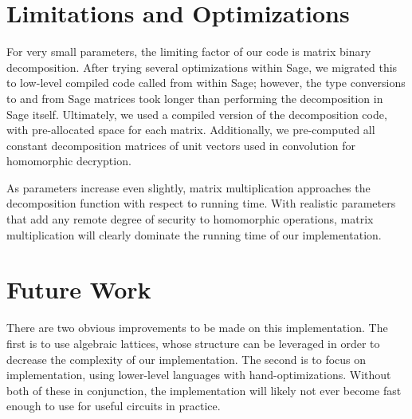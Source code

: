 \documentclass{article}
\begin{document}
\section{Limitations and Optimizations}

For very small parameters, the limiting factor of our code is matrix binary
decomposition. After trying several optimizations within Sage, we migrated
this to low-level compiled code called from within Sage; however, the type 
conversions to and from Sage matrices took longer than performing the 
decomposition in Sage itself. Ultimately, we used a compiled version of the 
decomposition code, with pre-allocated space for each matrix. Additionally,
we pre-computed all constant decomposition matrices of unit vectors used in
convolution for homomorphic decryption.

As parameters increase even slightly, matrix multiplication approaches the 
decomposition function with respect to running time. With realistic parameters
that add any remote degree of security to homomorphic operations, matrix 
multiplication will clearly dominate the running time of our implementation.

\section{Future Work}

There are two obvious improvements to be made on this implementation. The first
is to use algebraic lattices, whose structure can be leveraged in order to
decrease the complexity of our implementation. The second is to focus on
implementation, using lower-level languages with hand-optimizations. Without
both of these in conjunction, the implementation will likely not ever become
fast enough to use for useful circuits in practice. 
\end{document}
